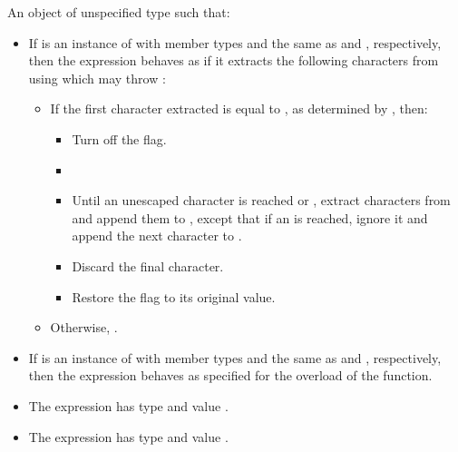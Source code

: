 \begin{itemdescr}
\pnum
\returns
An object of unspecified type such that:
\begin{itemize}
\item If  is an instance of  with member types
 and  the same as 
and , respectively, then the expression
 behaves as if it extracts the following
characters from  using
which may throw :
\begin{itemize}
\item If the first character extracted is equal to , as
determined by , then:
\begin{itemize}
\item Turn off the  flag.
\item {}
\item Until an unescaped  character is reached or ,
extract characters from  and append them to , except that
if an  is reached, ignore it and append the next character to
.
\item Discard the final  character.
\item Restore the  flag to its original value.
\end{itemize}
\item Otherwise, .
\end{itemize}
\item If  is an instance of  with member types
 and  the same as  and
, respectively, then the expression
 behaves as specified for the
 overload of the
 function.
\item
The expression  has type
 and value .
\item
The expression  has type
 and value .
\end{itemize}
\end{itemdescr}


